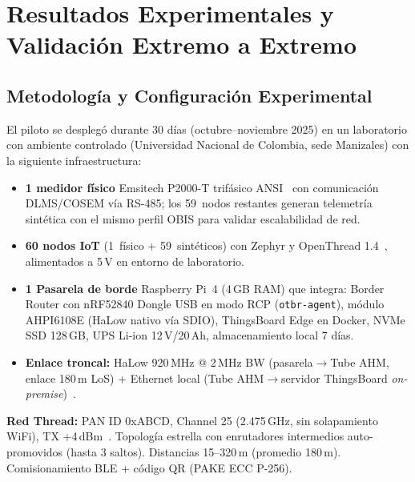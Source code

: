 \chapter[Resultados y Validación]{Resultados Experimentales y Validación Extremo a Extremo}
\label{chap:resultados}


\section{Metodología y Configuración Experimental}
\label{sec:resultados-metodologia}

El piloto se desplegó durante 30 días (octubre--noviembre 2025) en un laboratorio con ambiente controlado (Universidad Nacional de Colombia, sede Manizales) con la siguiente infraestructura:

\begin{itemize}
    \item \textbf{1 medidor físico} Emsitech P2000-T trifásico ANSI~\cite{emsitechP2000T2024} con comunicación DLMS/COSEM vía RS-485; los 59~nodos restantes generan telemetría sintética con el mismo perfil OBIS para validar escalabilidad de red.
    \item \textbf{60 nodos IoT} (1~físico + 59~sintéticos) con Zephyr y OpenThread 1.4~\cite{openthread2024}, alimentados a 5\,V en entorno de laboratorio.
    \item \textbf{1 Pasarela de borde} Raspberry Pi~4 (4\,GB RAM) que integra: Border Router con nRF52840 Dongle USB en modo RCP (\texttt{otbr-agent}), módulo AHPI6108E (HaLow nativo vía SDIO), ThingsBoard Edge en Docker, NVMe SSD 128\,GB, UPS Li-ion 12\,V/20\,Ah, almacenamiento local 7 días.
    \item \textbf{Enlace troncal:} HaLow 920\,MHz @ 2\,MHz BW (pasarela$\rightarrow$Tube AHM, enlace 180\,m LoS) + Ethernet local (Tube AHM$\rightarrow$servidor ThingsBoard \emph{on-premise})~\cite{tianWiFiHaLowInternet2021}.
\end{itemize}

\textbf{Red Thread:} PAN ID 0xABCD, Channel 25 (2.475\,GHz, sin solapamiento WiFi), TX +4\,dBm~\cite{IEEE802154-2020}. Topología estrella con enrutadores intermedios auto-promovidos (hasta 3 saltos). Distancias 15--320\,m (promedio 180\,m). Comisionamiento BLE + código QR (PAKE ECC P-256).

